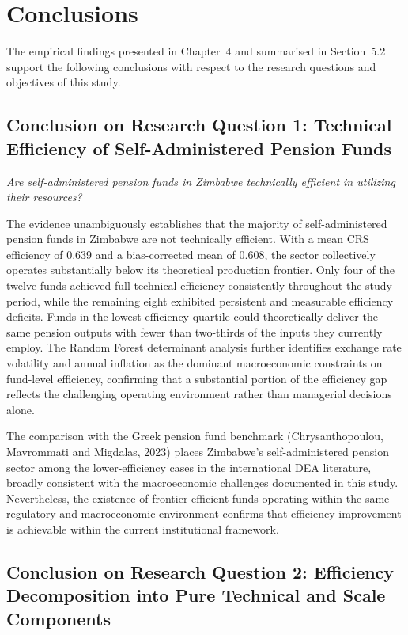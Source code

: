\documentclass[12pt,a4paper]{article}
\begin{document}
\section{Conclusions}

The empirical findings presented in Chapter~4 and summarised in Section~5.2 support the following conclusions with respect to the research questions and objectives of this study.

\subsection{Conclusion on Research Question 1: Technical Efficiency of Self-Administered Pension Funds}

\textit{Are self-administered pension funds in Zimbabwe technically efficient in utilizing their resources?}

The evidence unambiguously establishes that the majority of self-administered pension funds in Zimbabwe are not technically efficient. With a mean CRS efficiency of 0.639 and a bias-corrected mean of 0.608, the sector collectively operates substantially below its theoretical production frontier. Only four of the twelve funds achieved full technical efficiency consistently throughout the study period, while the remaining eight exhibited persistent and measurable efficiency deficits. Funds in the lowest efficiency quartile could theoretically deliver the same pension outputs with fewer than two-thirds of the inputs they currently employ. The Random Forest determinant analysis further identifies exchange rate volatility and annual inflation as the dominant macroeconomic constraints on fund-level efficiency, confirming that a substantial portion of the efficiency gap reflects the challenging operating environment rather than managerial decisions alone.

The comparison with the Greek pension fund benchmark (Chrysanthopoulou, Mavrommati and Migdalas, 2023) places Zimbabwe's self-administered pension sector among the lower-efficiency cases in the international DEA literature, broadly consistent with the macroeconomic challenges documented in this study. Nevertheless, the existence of frontier-efficient funds operating within the same regulatory and macroeconomic environment confirms that efficiency improvement is achievable within the current institutional framework.

\subsection{Conclusion on Research Question 2: Efficiency Decomposition into Pure Technical and Scale Components}
\end{document}
